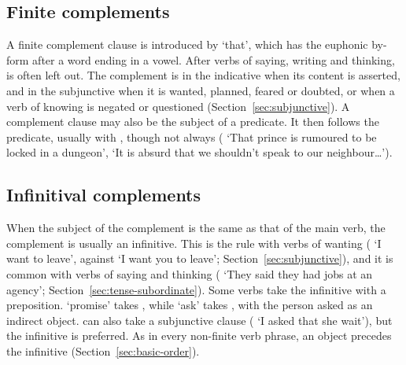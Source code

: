 \subsection{Finite complements}
A finite complement clause is introduced by  `that', which has the euphonic by-form  after a word ending in a vowel. After verbs of saying, writing and thinking,  is often left out.
The complement is in the indicative when its content is asserted, and in the subjunctive when it is wanted, planned, feared or doubted, or when a verb of knowing is negated or questioned (Section~\ref{sec:subjunctive}). A complement clause may also be the subject of a predicate. It then follows the predicate, usually with , though not always ( `That prince is rumoured to be locked in a dungeon',  `It is absurd that we shouldn't speak to our neighbour\ldots').

\subsection{Infinitival complements}
When the subject of the complement is the same as that of the main verb, the complement is usually an infinitive. This is the rule with verbs of wanting ( `I want to leave', against  `I want you to leave'; Section~\ref{sec:subjunctive}), and it is common with verbs of saying and thinking ( `They said they had jobs at an agency'; Section~\ref{sec:tense-subordinate}). Some verbs take the infinitive with a preposition.  `promise' takes , while  `ask' takes , with the person asked as an indirect object.  can also take a subjunctive clause ( `I asked that she wait'), but the infinitive is preferred.
As in every non-finite verb phrase, an object precedes the infinitive (Section~\ref{sec:basic-order}).

